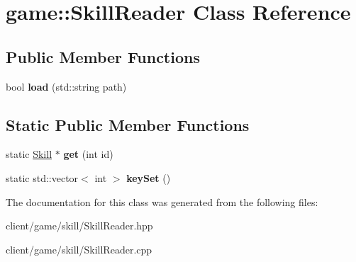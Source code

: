 \hypertarget{classgame_1_1_skill_reader}{\section{game\-:\-:Skill\-Reader Class Reference}
\label{classgame_1_1_skill_reader}
}
\subsection*{Public Member Functions}
\begin{DoxyCompactItemize}
\item 
\hypertarget{classgame_1_1_skill_reader_a9586fe4d23b221808c454cedbcc9ed80}{bool {\bfseries load} (std\-::string path)}\label{classgame_1_1_skill_reader_a9586fe4d23b221808c454cedbcc9ed80}

\end{DoxyCompactItemize}
\subsection*{Static Public Member Functions}
\begin{DoxyCompactItemize}
\item 
\hypertarget{classgame_1_1_skill_reader_a63eac68d86b6ed01a6fcf6fd7a36f907}{static \hyperlink{classgame_1_1_skill}{Skill} $\ast$ {\bfseries get} (int id)}\label{classgame_1_1_skill_reader_a63eac68d86b6ed01a6fcf6fd7a36f907}

\item 
\hypertarget{classgame_1_1_skill_reader_a674128479a60129378d6b01ab948802e}{static std\-::vector$<$ int $>$ {\bfseries key\-Set} ()}\label{classgame_1_1_skill_reader_a674128479a60129378d6b01ab948802e}

\end{DoxyCompactItemize}


The documentation for this class was generated from the following files\-:\begin{DoxyCompactItemize}
\item 
client/game/skill/Skill\-Reader.\-hpp\item 
client/game/skill/Skill\-Reader.\-cpp\end{DoxyCompactItemize}
